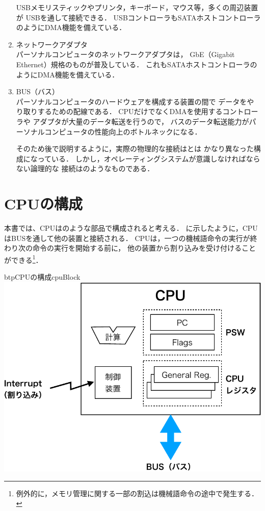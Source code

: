 \begin{enumerate}
  USBメモリスティックやプリンタ，キーボード，マウス等，多くの周辺装置が
  USBを通して接続できる．
  USBコントローラもSATAホストコントローラのようにDMA機能を備えている．
\item ネットワークアダプタ \\
  パーソナルコンピュータのネットワークアダプタは，
  GbE（Gigabit Ethernet）規格のものが普及している．
  これもSATAホストコントローラのようにDMA機能を備えている．
\item BUS（バス） \\
  パーソナルコンピュータのハードウェアを構成する装置の間で
  データをやり取りするための配線である．
  CPUだけでなくDMAを使用するコントローラや
  アダプタが大量のデータ転送を行うので，
  バスのデータ転送能力がパーソナルコンピュータの性能向上のボトルネックになる．

  そのため後で説明するように，実際の物理的な接続はとは
  かなり異なった構成になっている．
  しかし，オペレーティングシステムが意識しなければならない論理的な
  接続はのようなものである．
\end{enumerate}

\section{CPUの構成}
本書では、CPUはのような部品で構成されると考える．
に示したように，CPUはBUSを通して他の装置と接続される．
CPUは，一つの機械語命令の実行が終わり次の命令の実行を開始する前に，
他の装置から割り込みを受け付けることができる\footnote{
  例外的に，メモリ管理に関する一部の割込は機械語命令の途中で発生する．}．

\begin{myfig}{btp}{CPUの構成}{cpuBlock}
  \includegraphics[scale=0.66]{Fig/cpuBlock-crop.pdf}
\end{myfig}

